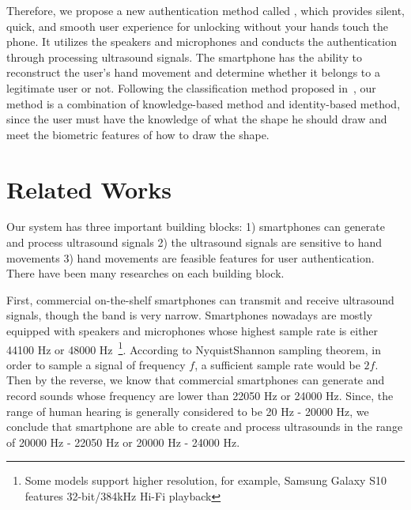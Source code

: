 Therefore, we propose a new authentication method called {\uu}, which provides silent, quick, and smooth user experience for unlocking without your hands touch the phone. It utilizes the speakers and microphones and conducts the authentication through processing ultrasound signals. The smartphone has the ability to reconstruct the user’s hand movement and determine whether it belongs to a legitimate user or not. Following the classification method proposed in~\cite{vongsingthong2015survey}, our method is a combination of knowledge-based method and identity-based method, since the user must have the knowledge of what the shape he should draw and meet the biometric features of how to draw the shape.

\section{Related Works}
Our {\uu} system has three important building blocks: 1) smartphones can generate and process ultrasound signals 2) the ultrasound signals are sensitive to hand movements 3) hand movements are feasible features for user authentication. There have been many researches on each  building block.

First, commercial on-the-shelf smartphones can transmit and receive ultrasound signals, though the band is very narrow. Smartphones nowadays are mostly equipped with speakers and microphones whose highest sample rate is either 44100 Hz or 48000 Hz~\footnote{Some models support higher resolution, for example, Samsung Galaxy S10 features 32-bit/384kHz Hi-Fi playback}. According to NyquistShannon sampling theorem, in order to sample a signal of frequency $f$, a sufficient sample rate would be $2f$. Then by the reverse, we know that commercial smartphones can generate and record sounds whose frequency are lower than 22050 Hz or 24000 Hz. Since, the range of human hearing is generally considered to be 20 Hz - 20000 Hz, we conclude that smartphone are able to create and process ultrasounds in the range of 20000 Hz - 22050 Hz or 20000 Hz - 24000 Hz.

